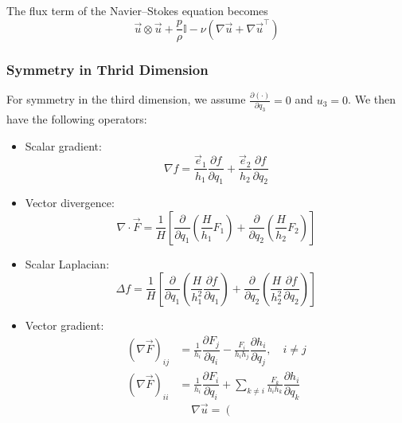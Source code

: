 \documentclass{article}
\numberwithin{equation}{section}
\newcommand{\pd}[2]{\dfrac{\partial #1}{\partial #2}}
\newcommand{\unitvec}[1]{\vec{e}_{#1}}
\begin{document}
The flux term of the Navier--Stokes equation becomes
\begin{equation}
    \vec{u} \otimes \vec{u} 
    + \frac{p}{\rho} \mathbb{I}
    - \nu \left(\nabla \vec{u} + \nabla \vec{u}^\top\right)
\end{equation}

\subsubsection{Symmetry in Thrid Dimension}

For symmetry in the third dimension, we assume $\frac{\partial (\cdot)}{\partial q_3} = 0$ and  $u_3 = 0$.
We then have the following operators:
\begin{itemize}
    \item Scalar gradient:
    \begin{equation}
        \nabla f
        = \frac{\unitvec{1}}{h_1} \pd{f}{q_1}
        + \frac{\unitvec{2}}{h_2} \pd{f}{q_2}
    \end{equation}
    \item Vector divergence:
    \begin{equation}
        \nabla \cdot \vec{F} =
        \frac{1}{H} \left[
              \pd{}{q_1} \left(\frac{H}{h_1} F_1\right)
            + \pd{}{q_2} \left(\frac{H}{h_2} F_2\right)
        \right]
    \end{equation}
    \item Scalar Laplacian:
    \begin{equation}
        \Delta f = 
        \frac{1}{H} \left[
              \pd{}{q_1} \left(\frac{H}{h_1^2} \pd{f}{q_1}\right)
            + \pd{}{q_2} \left(\frac{H}{h_2^2} \pd{f}{q_2}\right)
        \right]
    \end{equation}
    \item Vector gradient:
    \begin{equation}
        \begin{split}
            \left(\nabla \vec{F}\right)_{ij} &=
            \frac{1}{h_i} \pd{F_j}{q_i} - \frac{F_i}{h_i h_j} \pd{h_i}{q_j}, \quad i \ne j \\
            \left(\nabla \vec{F}\right)_{ii} &=
            \frac{1}{h_i} \pd{F_i}{q_i} + \sum_{k \ne i} \frac{F_k}{h_i h_k} \pd{h_i}{q_k}
        \end{split}
    \end{equation}
    \begin{equation}
        \nabla \vec{u} = \left(\begin{matrix}

\end{matrix}
\end{equation}
\end{itemize}
\end{document}
